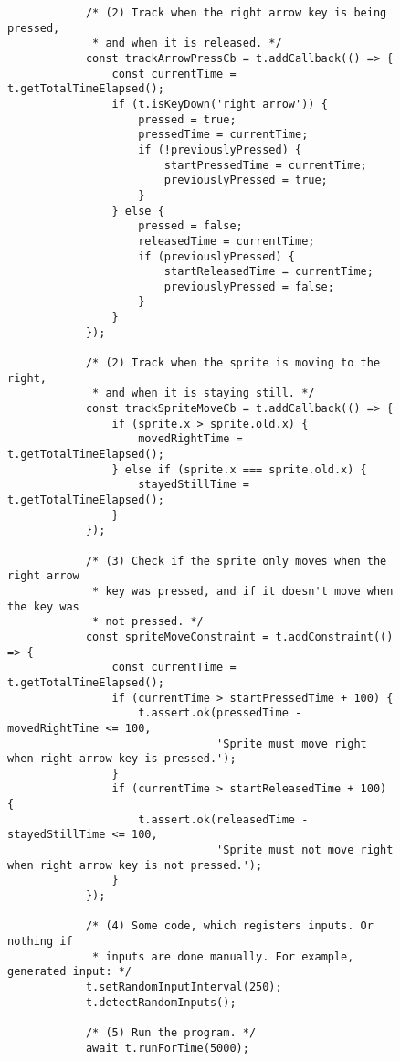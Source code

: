 \begin{listing}[htpb]
\begin{subfigure}[b]{.55\textwidth}
\begin{verbatim}
            /* (2) Track when the right arrow key is being pressed,
             * and when it is released. */
            const trackArrowPressCb = t.addCallback(() => {
                const currentTime = t.getTotalTimeElapsed();
                if (t.isKeyDown('right arrow')) {
                    pressed = true;
                    pressedTime = currentTime;
                    if (!previouslyPressed) {
                        startPressedTime = currentTime;
                        previouslyPressed = true;
                    }
                } else {
                    pressed = false;
                    releasedTime = currentTime;
                    if (previouslyPressed) {
                        startReleasedTime = currentTime;
                        previouslyPressed = false;
                    }
                }
            });

            /* (2) Track when the sprite is moving to the right,
             * and when it is staying still. */
            const trackSpriteMoveCb = t.addCallback(() => {
                if (sprite.x > sprite.old.x) {
                    movedRightTime = t.getTotalTimeElapsed();
                } else if (sprite.x === sprite.old.x) {
                    stayedStillTime = t.getTotalTimeElapsed();
                }
            });

            /* (3) Check if the sprite only moves when the right arrow
             * key was pressed, and if it doesn't move when the key was
             * not pressed. */
            const spriteMoveConstraint = t.addConstraint(() => {
                const currentTime = t.getTotalTimeElapsed();
                if (currentTime > startPressedTime + 100) {
                    t.assert.ok(pressedTime - movedRightTime <= 100,
                                'Sprite must move right when right arrow key is pressed.');
                }
                if (currentTime > startReleasedTime + 100) {
                    t.assert.ok(releasedTime - stayedStillTime <= 100,
                                'Sprite must not move right when right arrow key is not pressed.');
                }
            });

            /* (4) Some code, which registers inputs. Or nothing if
             * inputs are done manually. For example, generated input: */
            t.setRandomInputInterval(250);
            t.detectRandomInputs();

            /* (5) Run the program. */
            await t.runForTime(5000);


\end{verbatim}
\end{subfigure}
\end{listing}
